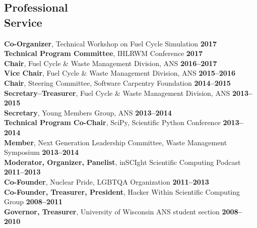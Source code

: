 \documentclass[margin,line]{resume}
\begin{document}
\begin{resume}
    \section{\mysidestyle Professional\\Service}
		\textbf{Co-Organizer}, Technical Workshop on Fuel Cycle Simulation \hfill \textbf{2017}\vspace{.5mm}\\%
		\textbf{Technical Program Committee}, IHLRWM Conference \hfill \textbf{2017}\vspace{.5mm}\\%
		\textbf{Chair}, Fuel Cycle \& Waste Management Division, ANS  \hfill \textbf{2016--2017}\vspace{.5mm}\\%
		\textbf{Vice Chair}, Fuel Cycle \& Waste Management Division, ANS  \hfill \textbf{2015--2016}\vspace{.5mm}\\%
		\textbf{Chair}, Steering Committee, Software Carpentry Foundation   \hfill \textbf{2014--2015}\vspace{.5mm}\\%
		\textbf{Secretary--Treasurer}, Fuel Cycle \& Waste Management Division, ANS  \hfill \textbf{2013--2015}\vspace{.5mm}\\%
		\textbf{Secretary}, Young Members Group, ANS  \hfill \textbf{2013--2014}\vspace{.5mm}\\%
		\textbf{Technical Program Co-Chair}, SciPy, Scientific Python Conference   \hfill \textbf{2013--2014}\vspace{.5mm}\\%
		\textbf{Member}, Next Generation Leadership Committee, Waste Management Symposium  \hfill \textbf{2013--2014}\vspace{.5mm}\\%
		\textbf{Moderator, Organizer, Panelist}, inSCIght Scientific Computing Podcast  \hfill \textbf{2011--2013}\vspace{.5mm}\\%
		\textbf{Co-Founder}, Nuclear Pride, LGBTQA Organization  \hfill \textbf{2011--2013}\vspace{.5mm}\\%
		\textbf{Co-Founder, Treasurer, President}, Hacker Within Scientific Computing Group  \hfill \textbf{2008--2011}\vspace{.5mm}\\%
		\textbf{Governor, Treasurer}, University of Wisconsin ANS student section  \hfill \textbf{2008--2010}\vspace{.5mm}%

\end{resume}
\end{document}
